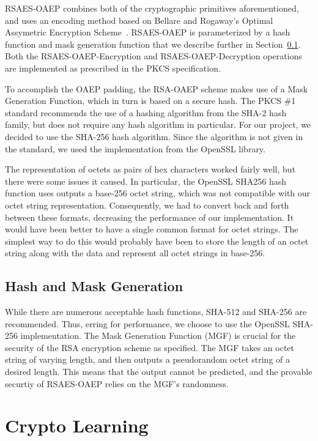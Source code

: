 \documentclass[a4paper]{article}
\begin{document}
RSAES-OAEP combines both of the cryptographic primitives aforementioned, and uses an encoding method based on Bellare and Rogaway's Optimal Assymetric Encryption Scheme~\cite{bellare1994optimal}. RSAES-OAEP is parameterized by a hash function and mask generation function that we describe further in Section~\ref{sec:hash}. Both the RSAES-OAEP-Encryption and RSAES-OAEP-Decryption operations are implemented as prescribed in the PKCS specification.

To accomplish the OAEP padding, the RSA-OAEP scheme makes use of a Mask Generation Function, which in turn is based on a secure hash. The PKCS \#1 standard recommends the use of a hashing algorithm from the SHA-2 hash family, but does not require any hash algorithm in particular. For our project, we decided to use the SHA-256 hash algorithm. Since the algorithm is not given in the standard, we used the implementation from the OpenSSL library.

The representation of octets as pairs of hex characters worked fairly well, but there were some issues it caused. In particular, the OpenSSL SHA256 hash function uses outputs a base-256 octet string, which was not compatible with our octet string representation. Consequently, we had to convert back and forth between these formats, decreasing the performance of our implementation. It would have been better to have a single common format for octet strings. The simplest way to do this would probably have been to store the length of an octet string along with the data and represent all octet strings in base-256.


\subsection{Hash and Mask Generation}\label{sec:hash}

While there are numerous acceptable hash functions, SHA-512 and SHA-256 are recommended.
Thus, erring for performance, we choose to use the OpenSSL SHA-256 implementation. The Mask Generation Function (MGF) is crucial for the security of the RSA encryption scheme as specified. 
The MGF takes an octet string of varying length, and then outputs a pseudorandom octet string of a desired length. This means that the output cannot be predicted, and the provable securtiy of RSAES-OAEP relies on the MGF's randomness.

\section{Crypto Learning}
\end{document}
